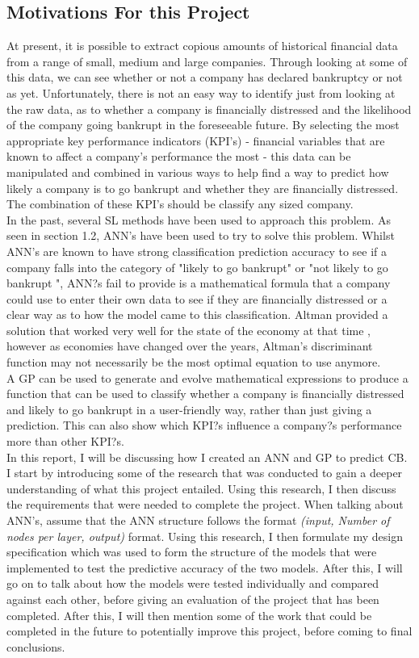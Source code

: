 \documentclass[11pt]{article}
\begin{document}
\subsection{Motivations For this Project}
At present, it is possible to extract copious amounts of historical financial data from a range of small, medium and large companies. Through looking at some of this data, we can see whether or not a company has declared bankruptcy or not as yet. Unfortunately, there is not an easy way to identify just from looking at the raw data, as to whether a company is financially distressed and the likelihood of the company going bankrupt in the foreseeable future. By selecting the most appropriate key performance indicators (KPI's) - financial variables that are known to affect a company's performance the most - this data can be manipulated and combined in various ways to help find a way to predict how likely a company is to go bankrupt and whether they are financially distressed. The combination of these KPI's should be classify any sized company. \\
In the past, several SL methods have been used to approach this problem. As seen in section 1.2, ANN's have been used to try to solve this problem. Whilst ANN's are known to have strong classification prediction accuracy to see if a company falls into the category of "likely to go bankrupt" or "not likely to go bankrupt ", ANN?s fail to provide is a mathematical formula that a company could use to enter their own data to see if they are financially distressed or a clear way as to how the model came to this classification. Altman provided a solution that worked very well for the state of the economy at that time \cite{?}, however as economies have changed over the years, Altman's discriminant function may not necessarily be the most optimal equation to use anymore. \\
A GP can be used to generate and evolve mathematical expressions to produce a function that can be used to classify whether a company is financially distressed and likely to go bankrupt in a user-friendly way, rather than just giving a prediction. This can also show which KPI?s influence a company?s performance more than other KPI?s.  \\


In this report, I will be discussing how I created an ANN and GP to predict CB. I start by introducing some of the research that was conducted to gain a deeper understanding of what this project entailed. Using this research, I then discuss the requirements that were needed to complete the project. When talking about ANN's, assume that the ANN structure follows the format \textit{(input, Number of nodes per layer, output)} format. Using this research, I then formulate my design specification which was used to form the structure of the models that were implemented to test the predictive accuracy of the two models. After this, I will go on to talk about how the models were tested individually and compared against each other, before giving an evaluation of the project that has been completed. After this, I will then mention some of the work that could be completed in the future to potentially improve this project, before coming to final conclusions. 
\end{document}
